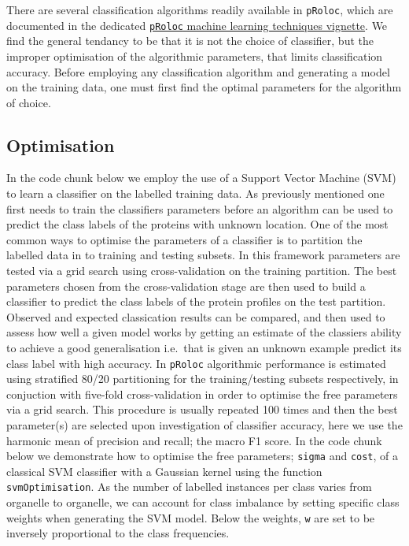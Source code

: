 There are several classification algorithms readily available in
\texttt{pRoloc}, which are documented in the dedicated
\href{http://bioconductor.org/packages/release/bioc/vignettes/pRoloc/inst/doc/pRoloc-ml.pdf}{\texttt{pRoloc}
machine learning techniques vignette}. We find the general tendancy to
be that it is not the choice of classifier, but the improper
optimisation of the algorithmic parameters, that limits classification
accuracy. Before employing any classification algorithm and generating a
model on the training data, one must first find the optimal parameters
for the algorithm of choice.

\subsection{Optimisation}\label{optimisation}

In the code chunk below we employ the use of a Support Vector Machine
(SVM) to learn a classifier on the labelled training data. As previously
mentioned one first needs to train the classifiers parameters before an
algorithm can be used to predict the class labels of the proteins with
unknown location. One of the most common ways to optimise the parameters
of a classifier is to partition the labelled data in to training and
testing subsets. In this framework parameters are tested via a grid
search using cross-validation on the training partition. The best
parameters chosen from the cross-validation stage are then used to build
a classifier to predict the class labels of the protein profiles on the
test partition. Observed and expected classication results can be
compared, and then used to assess how well a given model works by
getting an estimate of the classiers ability to achieve a good
generalisation i.e.~that is given an unknown example predict its class
label with high accuracy. In \texttt{pRoloc} algorithmic performance is
estimated using stratified 80/20 partitioning for the training/testing
subsets respectively, in conjuction with five-fold cross-validation in
order to optimise the free parameters via a grid search. This procedure
is usually repeated 100 times and then the best parameter(s) are
selected upon investigation of classifier accuracy, here we use the
harmonic mean of precision and recall; the macro F1 score. In the code
chunk below we demonstrate how to optimise the free parameters;
\texttt{sigma} and \texttt{cost}, of a classical SVM classifier with a
Gaussian kernel using the function \texttt{svmOptimisation}. As the
number of labelled instances per class varies from organelle to
organelle, we can account for class imbalance by setting specific class
weights when generating the SVM model. Below the weights, \texttt{w} are
set to be inversely proportional to the class frequencies.

